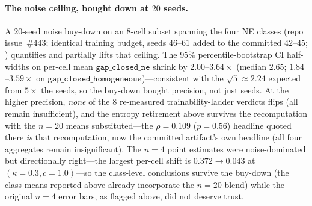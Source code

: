 \documentclass{anvil-paper}
\begin{document}
\paragraph{The noise ceiling, bought down at $20$ seeds.}
A $20$-seed noise buy-down on an $8$-cell subset spanning the four NE
classes (repo issue~\#443; identical training budget, seeds $46$--$61$
added to the committed $42$--$45$;
)
quantifies and partially lifts that ceiling. The $95\%$
percentile-bootstrap CI half-widths on per-cell mean
$\texttt{gap\_closed\_ne}$ shrink by $2.00$--$3.64{\times}$
(median $2.65$; $1.84$--$3.59{\times}$ on
$\texttt{gap\_closed\_homogeneous}$)---consistent with the
$\sqrt{5}\approx 2.24$ expected from $5{\times}$ the seeds, so the
buy-down bought precision, not just seeds. At the higher precision,
\emph{none} of the $8$ re-measured trainability-ladder verdicts flips
(all remain \textsf{insufficient}), and the entropy retirement above
survives the recomputation with the $n{=}20$ means substituted---the
$\rho{=}0.109$ ($p{=}0.56$) headline quoted there \emph{is} that
recomputation, now the committed artifact's own headline (all four
aggregates remain insignificant). The
$n{=}4$ point estimates were noise-dominated but directionally
right---the largest per-cell shift is $0.372\to 0.043$ at
$(\kappa{=}0.3, c{=}1.0)$---so the class-level conclusions survive the
buy-down (the class means reported above already incorporate the
$n{=}20$ blend) while the original $n{=}4$ error bars, as flagged
above, did not deserve trust.
\end{document}
